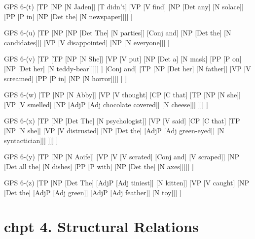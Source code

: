 \documentclass{article}
\begin{document}
\bigskip
\noindent
\begin{gpstree}[\textwidth]{GPS 6-(t)}
[TP
  [NP [N Jaden]]
  [T didn't]
  [VP [V find] [NP [Det any] [N solace]] [PP [P in] [NP [Det the] [N newspaper]]]]
] 
\end{gpstree}

\bigskip
\noindent
\begin{gpstree}[\textwidth]{GPS 6-(u)}
[TP
  [NP [NP [Det The] [N parties]] [Conj and] [NP [Det the] [N candidates]]]
  [VP [V disappointed] [NP [N everyone]]]
]
\end{gpstree}

\bigskip
\noindent
\begin{gpstree}[\textwidth]{GPS 6-(v)}
[TP
  [TP 
    [NP [N She]]
    [VP [V put] [NP [Det a] [N mask] [PP [P on] [NP [Det her] [N teddy-bear]]]]]
  ]
  [Conj and]
  [TP
    [NP [Det her] [N father]]
    [VP [V screamed] [PP [P in] [NP [N horror]]]]
  ]
]
\end{gpstree}

\bigskip
\noindent
\begin{gpstree}[\textwidth]{GPS 6-(w)}
[TP
  [NP [N Abby]]
  [VP [V thought] [CP [C that]
  [TP [NP [N she]]
      [VP [V smelled] [NP [AdjP [Adj {chocolate covered}]] [N cheese]]]
  ]]]
] 
\end{gpstree}

\bigskip
\noindent
\begin{gpstree}[\textwidth]{GPS 6-(x)}
[TP
  [NP [Det The] [N psychologist]]
  [VP [V said] [CP [C that]
  [TP [NP [N she]]
      [VP [V distrusted] [NP [Det the] [AdjP [Adj green-eyed]] [N syntactician]]]
  ]]]
] 
\end{gpstree}

\bigskip
\noindent
\begin{gpstree}[\textwidth]{GPS 6-(y)}
[TP
  [NP [N Aoife]]
  [VP [V [V scrated] [Conj and] [V scraped]] [NP [Det {all the}] [N dishes] [PP [P with] [NP [Det the] [N axes]]]]]
] 
\end{gpstree}

\bigskip
\noindent
\begin{gpstree}[\textwidth]{GPS 6-(z)}
[TP
  [NP [Det The] [AdjP [Adj tiniest]] [N kitten]]
  [VP [V caught] [NP [Det the] [AdjP [Adj green]] [AdjP [Adj feather]] [N toy]]]
] 
\end{gpstree}

\newpage
\section{chpt 4. Structural Relations}
\end{document}
